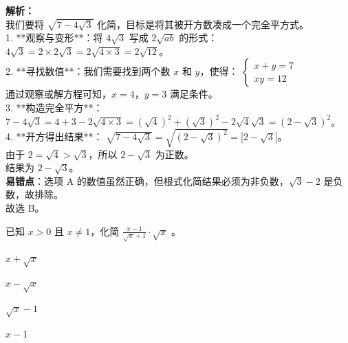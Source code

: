 \begin{solution}
    \textbf{解析：} \\
    我们要将 $\displaystyle \sqrt{7 - 4\sqrt{3}}$ 化简，目标是将其被开方数凑成一个完全平方式。 \\
    
    1. **观察与变形**：将 $4\sqrt{3}$ 写成 $2\sqrt{ab}$ 的形式：
    $\displaystyle 4\sqrt{3} = 2 \times 2\sqrt{3} = 2\sqrt{4 \times 3} = 2\sqrt{12}$。 \\
    
    2. **寻找数值**：我们需要找到两个数 $x$ 和 $y$，使得：
    $\begin{cases} x + y = 7 \\ xy = 12 \end{cases}$ \\
    通过观察或解方程可知，$x=4$，$y=3$ 满足条件。 \\
    
    3. **构造完全平方**：
    $\displaystyle 7 - 4\sqrt{3} = 4 + 3 - 2\sqrt{4 \times 3} = (\sqrt{4})^2 + (\sqrt{3})^2 - 2\sqrt{4}\sqrt{3} = (2 - \sqrt{3})^2$。 \\
    
    4. **开方得出结果**：
    $\displaystyle \sqrt{7 - 4\sqrt{3}} = \sqrt{(2 - \sqrt{3})^2} = |2 - \sqrt{3}|$。 \\
    由于 $2 = \sqrt{4} > \sqrt{3}$，所以 $2 - \sqrt{3}$ 为正数。 \\
    结果为 $\displaystyle 2 - \sqrt{3}$。 \\
    
    \textbf{易错点}：选项 A 的数值虽然正确，但根式化简结果必须为非负数，$\sqrt{3}-2$ 是负数，故排除。 \\
    故选 B。
\end{solution}

\begin{question}
    已知 $x > 0$ 且 $x \neq 1$，化简 $\displaystyle \frac{x-1}{\sqrt{x}+1} \cdot \sqrt{x}$ 。 \paren[B]
    \begin{choices}
        \item $\displaystyle x + \sqrt{x}$ 
        \item $\displaystyle x - \sqrt{x}$ 
        \item $\displaystyle \sqrt{x} - 1$ 
        \item $\displaystyle x - 1$
    \end{choices}
\end{question}

